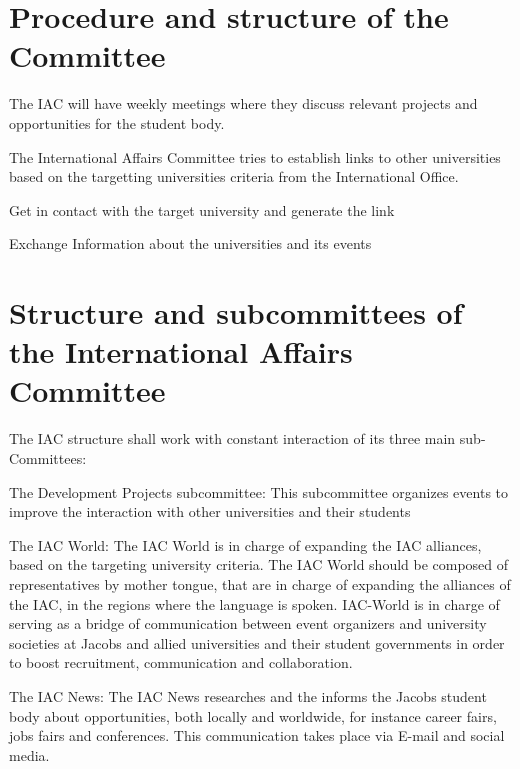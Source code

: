 {\protect\section{Procedure and structure of the Committee}
The IAC will have weekly meetings where they discuss relevant projects and opportunities for the student body.
\protect\begin{parenum}
	\item The International Affairs Committee tries to establish links to other universities based on the targetting universities criteria from the International Office.
	\item Get in contact with the target university and generate the link
	\item  Exchange Information about the universities and its events
 \end{parenum}

\protect\section{Structure and subcommittees of the International Affairs Committee}
	The IAC structure shall work with constant interaction of its three main sub-Committees:
	\protect\begin{parenum}
		\item The Development Projects subcommittee:
		This subcommittee organizes events to improve the interaction with other universities and their students
		\item The IAC World:
		The IAC World is in charge of expanding the IAC alliances, based on the targeting university criteria.
		The IAC World should be composed of representatives by mother tongue, that are in charge of expanding the alliances of the IAC, in the regions where the language is spoken.
		IAC-World is in charge of serving as a bridge of communication between event organizers and university societies at Jacobs and allied universities and their student governments in order to boost recruitment, communication and collaboration.
		\item The IAC News:
		The IAC News researches and the informs the Jacobs student body about opportunities, both locally and worldwide, for instance career fairs, jobs fairs and conferences. 
		This communication takes place via E-mail and social media.
	\end{parenum}

}
